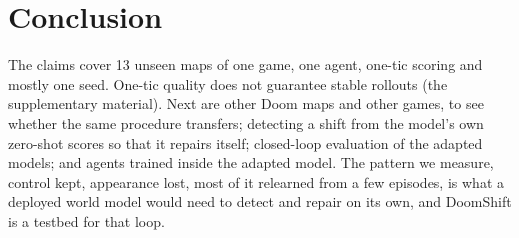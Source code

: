 \documentclass{article}
\newif\ifdraftmarks \draftmarksfalse
\newif\ifwithappendix \withappendixfalse %
\newcommand{\appref}[1]{\ifwithappendix Appendix~\ref{#1}\else the supplementary material\fi}
\newcommand{\tbd}{\ifdraftmarks\textcolor[rgb]{0,0.3,0.75}{[tbd]}\else[tbd]\fi}
\begin{document}
\section{Conclusion}
\label{sec:limits}

The claims cover 13 unseen maps of one game, one agent, one-tic scoring and mostly one seed.
One-tic quality does not guarantee stable rollouts (\appref{app:closedloop}).
Next are other Doom maps and other games, to see whether the same procedure transfers; detecting a shift from the model's own zero-shot scores so that it repairs itself; closed-loop evaluation of the adapted models; and agents trained inside the adapted model.
The pattern we measure, control kept, appearance lost, most of it relearned from a few episodes, is what a deployed world model would need to detect and repair on its own, and DoomShift is a testbed for that loop.
\label{body-end}


\clearpage
\acknowledgments{\tbd}

{\sloppy}

\ifwithappendix
\clearpage
\appendix

\fi
\end{document}
